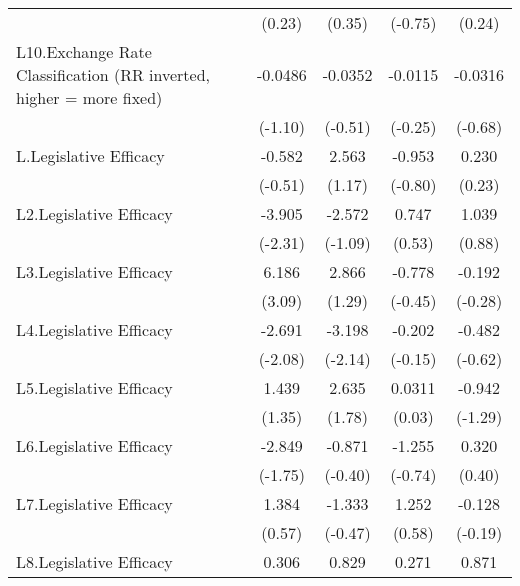 {\begin{longtable}{l*{4}{c}}
                &   (0.23)         &   (0.35)         &  (-0.75)         &   (0.24)         \\
\addlinespace
L10.Exchange Rate Classification (RR inverted, higher = more fixed)&  -0.0486         &  -0.0352         &  -0.0115         &  -0.0316         \\
                &  (-1.10)         &  (-0.51)         &  (-0.25)         &  (-0.68)         \\
\addlinespace
L.Legislative Efficacy&   -0.582         &    2.563         &   -0.953         &    0.230         \\
                &  (-0.51)         &   (1.17)         &  (-0.80)         &   (0.23)         \\
\addlinespace
L2.Legislative Efficacy&   -3.905\sym{*}  &   -2.572         &    0.747         &    1.039         \\
                &  (-2.31)         &  (-1.09)         &   (0.53)         &   (0.88)         \\
\addlinespace
L3.Legislative Efficacy&    6.186\sym{**} &    2.866         &   -0.778         &   -0.192         \\
                &   (3.09)         &   (1.29)         &  (-0.45)         &  (-0.28)         \\
\addlinespace
L4.Legislative Efficacy&   -2.691\sym{*}  &   -3.198\sym{*}  &   -0.202         &   -0.482         \\
                &  (-2.08)         &  (-2.14)         &  (-0.15)         &  (-0.62)         \\
\addlinespace
L5.Legislative Efficacy&    1.439         &    2.635         &   0.0311         &   -0.942         \\
                &   (1.35)         &   (1.78)         &   (0.03)         &  (-1.29)         \\
\addlinespace
L6.Legislative Efficacy&   -2.849         &   -0.871         &   -1.255         &    0.320         \\
                &  (-1.75)         &  (-0.40)         &  (-0.74)         &   (0.40)         \\
\addlinespace
L7.Legislative Efficacy&    1.384         &   -1.333         &    1.252         &   -0.128         \\
                &   (0.57)         &  (-0.47)         &   (0.58)         &  (-0.19)         \\
\addlinespace
L8.Legislative Efficacy&    0.306         &    0.829         &    0.271         &    0.871         \\

\end{longtable}}
